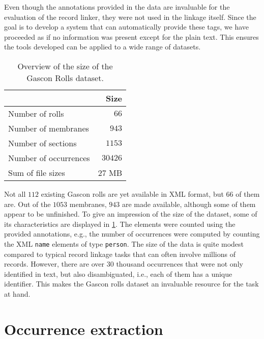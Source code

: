 Even though the annotations provided in the data are invaluable for the evaluation of the record linker, they were not used in the linkage itself.
Since the goal is to develop a system that can automatically provide these tags, we have proceeded as if no information was present except for the plain text.
This ensures the tools developed can be applied to a wide range of datasets.

\begin{table}
    \centering
    \begin{tabular}{l r}
        \toprule
        & Size \\
        \midrule
        Number of rolls & $66$ \\
        Number of membranes & $943$ \\
        Number of sections & $1153$ \\
        Number of occurrences & $30426$ \\
        Sum of file sizes & $27$ MB \\
        \bottomrule
    \end{tabular}
    \caption{Overview of the size of the Gascon Rolls dataset.}
    \label{tab:data_overview}
\end{table}

Not all $112$ existing Gascon rolls are yet available in XML format, but $66$ of them are.
Out of the $1053$ membranes, $943$ are made available, although some of them appear to be unfinished.
To give an impression of the size of the dataset, some of its characteristics are displayed in \cref{tab:data_overview}.
The elements were counted using the provided annotations, e.g., the number of occurrences were computed by counting the XML \texttt{name} elements of type \texttt{person}.
The size of the data is quite modest compared to typical record linkage tasks that can often involve millions of records.
However, there are over $30$ thousand occurrences that were not only identified in text, but also disambiguated, i.e., each of them has a unique identifier.
This makes the Gascon rolls dataset an invaluable resource for the task at hand.




\section{Occurrence extraction}
\label{sec:occurrence_extraction}

